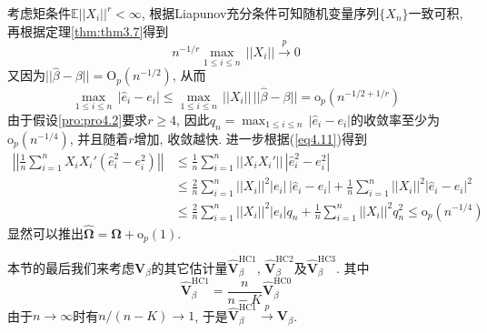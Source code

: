 \documentclass[cn, 12pt, math=mtpro2, bibstyle=apa, blue, twocol]{elegantbook}
\newcommand{\E}{\mathbb{E}}
\newcommand{\hb}{\hat{\beta}}
\newcommand{\V}{\mathbold{V}}
\begin{document}
考虑矩条件$\E||X_i||^r<\infty$, 根据Liapunov充分条件可知随机变量序列$\{X_n\}$一致可积, 再根据定理\ref{thm:thm3.7}得到
$$n^{-1/r}\max_{1\leq i\leq n}\,||X_i||\xrightarrow{p}0$$
又因为$||\hb-\beta||=\text{O}_p(n^{-1/2})$, 从而
\begin{equation}\label{eq4.11}
  \max_{1\leq i\leq n}\,|\hat{e}_i-e_i|\leq\max_{1\leq i\leq n}\,||X_i||\,||\hb-\beta||=\text{o}_p(n^{-1/2+1/r})
\end{equation}
由于假设\ref{pro:pro4.2}要求$r\geq4$, 因此$\displaystyle q_n =\max_{1\leq i\leq n}\,|\hat{e}_i-e_i|$的收敛率至少为$\text{o}_{p}(n^{-1/4})$, 并且随着$r$增加, 收敛越快. 进一步根据(\ref{eq4.11})得到
\begin{align*}
\left|\left|\frac{1}{n}\sum_{i=1}^{n}X_iX_i'(\hat{e}_i^2-e_i^2)\right|\right|&\leq\frac{1}{n}\sum_{i=1}^{n}||X_iX_i'||\,|\hat{e}_i^2-e_i^2| \\
&\leq\frac{2}{n}\sum_{i=1}^{n}||X_i||^2|e_i|\,|\hat{e}_i-e_i|+\frac{1}{n}\sum_{i=1}^{n}||X_i||^2|\hat{e}_i-e_i|^2 \\
&\leq\frac{2}{n}\sum_{i=1}^{n}||X_i||^2|e_i|q_n+\frac{1}{n}\sum_{i=1}^{n}||X_i||^2q_n^2\leq\text{o}_p(n^{-1/4})
\end{align*}
显然可以推出$\hat{\mathbold{\Omega}}=\mathbold{\Omega}+\text{o}_p(1)$.

本节的最后我们来考虑$\V_\beta$的其它估计量$\hat{\V}_\beta^{\text{HC1}}$, $\hat{\V}_\beta^{\text{HC2}}$及$\hat{\V}_\beta^{\text{HC3}}$. 其中
$$\hat{\V}_\beta^{\text{HC1}}=\frac{n}{n-K}\hat{\V}_\beta^{\text{HC0}}$$
由于$n\to\infty$时有$n/(n-K)\to1$, 于是$\hat{\V}_\beta^{\text{HC1}}\xrightarrow{p}\V_\beta$.
\end{document}
